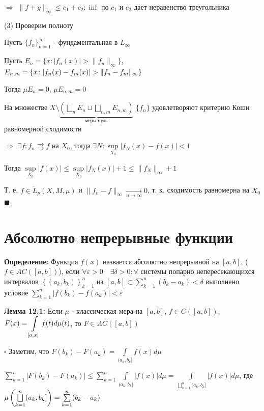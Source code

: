 \documentclass[a4paper]{report}
\newcommand*{\hm}[1]{#1\nobreak\discretionary{}%
            {\hbox{$\mathsurround=0pt #1$}}{}}
\begin{document}
$\Rightarrow$ $\|f+g\|_\infty\le c_1+c_2\colon\inf$ по $c_1$ и $c_2$ дает неравенство треугольника

(3) Проверим полноту

Пусть $\{f_n\}_{n=1}^\infty$ - фундаментальная в $L_\infty$

Пусть $E_n=\{x\colon|f_n(x)|>\|f_n\|_\infty\}$, $E_{n,m}=\{x\colon|f_n(x)-f_m(x)|>\|f_n\hm-f_m\|_\infty\}$

Тогда $\mu E_n=0$, $\mu E_{n,m}=0$

На множестве $X\setminus\underbrace{\left(\bigsqcup\limits_n E_n\sqcup\bigsqcup\limits_{n,m}E_{n,m}\right)}_{\text{меры нуль}}$ $\{f_n\}$ удовлетворяют критерию Коши равномерной сходимости

$\Rightarrow$ $\exists f\colon f_n\rightrightarrows f$ на $X_0$, тогда $\exists N\colon \sup\limits_{X_0}|f_N(x)-f(x)|<1$

Тогда $\sup\limits_{X_0}|f(x)|\le\sup\limits_{X_0}|f_N(x)|+1\le\|f_N\|_\infty+1$

Т. е. $f\in\tilde L_p(X,M,\mu)$ и $\|f_n-f\|_\infty\xrightarrow[n\to\infty]{}0$, т. к. сходимость равномерна на $X_0$ $\blacksquare$







\chapter{Абсолютно непрерывные функции} 

\noindent\textbf{Определение:} Функция $f(x)$ назвается абсолютно непрерывной на $[a,b]$, ($f\in AC([a,b])$), если $\forall\varepsilon>0\quad\exists\delta>0\colon\forall$ системы попарно непересекающихся интервалов $\left\{(a_k,b_k)\right\}_{k=1}^n$ из $[a,b]\subset\sum\limits_{k=1}^n(b_k-a_k)<\delta$ выполнено условие
$\sum\limits_{k=1}^n|f(b_k)-f(a_k)|<\varepsilon$
\bigskip

\noindent\textbf{Лемма 12.1:} Если $\mu$ - классическая мера на $[a,b]$, $f\in C([a,b])$, $F(x)\hm=\displaystyle\int\limits_{[a,x]}f(t)d\mu(t)$, то $F\in AC([a,b])$

\noindent $\square$ Заметим, что $F(b_k)-F(a_k)=\displaystyle\int\limits_{(a_k,b_k]}f(x)d\mu$

$\sum\limits_{k=1}^n|F(b_k)-F(a_k)|\le\sum\limits_{k=1}^n\displaystyle\int\limits_{(a_k,b_k]}|f(x)|d\mu=\displaystyle\int\limits_{\bigsqcup\limits_{k=1}^n(a_k,b_k]}|f(x)|d\mu$, где $\mu\left(\bigsqcup\limits_{k=1}^n(a_k,b_k]\right)\hm=\sum\limits_{k=1}^n(b_k-a_k)$ 
\end{document}
